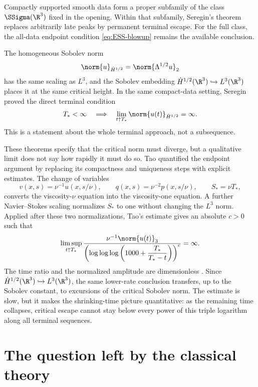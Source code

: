 Compactly supported smooth data form a proper subfamily of the class
\(\SSigma(\R^3)\) fixed in the opening.  Within that subfamily, Seregin's
theorem replaces arbitrarily late peaks by permanent terminal escape.  For
the full class, the all-data endpoint condition \eqref{eq:ESS-blowup} remains
the available conclusion.

The homogeneous Sobolev norm
\[
 \norm{u}_{\dot H^{1/2}}
 =\norm{\Lambda^{1/2}u}_2
\]
has the same scaling as \(L^3\), and the Sobolev embedding
\(\dot H^{1/2}(\R^3)\hookrightarrow L^3(\R^3)\) places it at the same
critical height.  In the same compact-data setting, Seregin proved the direct
terminal condition
\begin{equation}
 T_*<\infty
 \quad\Longrightarrow\quad
 \lim_{t\uparrow T_*}\norm{u(t)}_{\dot H^{1/2}}=\infty.
 \label{eq:seregin-critical-divergence}
\end{equation}
This is a statement about the whole terminal approach, not a
subsequence.

These theorems specify that the critical norm must diverge, but a qualitative
limit does not say how rapidly it must do so.  Tao quantified the endpoint
argument by replacing its compactness and uniqueness steps with explicit
estimates.  The change of variables
\[
 v(x,s)=\nu^{-1}u(x,s/\nu),
 \qquad q(x,s)=\nu^{-2}p(x,s/\nu),
 \qquad S_*=\nu T_*,
\]
converts the viscosity-\(\nu\) equation into the viscosity-one equation.
A further Navier--Stokes scaling normalizes \(S_*\) to one without changing
the \(L^3\) norm.  Applied after these two normalizations, Tao's estimate gives
an absolute \(c>0\) such that
\[
 \limsup_{t\uparrow T_*}
 \frac{\nu^{-1}\norm{u(t)}_3}
 {\left(\log\log\log\left(1000+
   \dfrac{T_*}{T_*-t}\right)\right)^c}
 =\infty.
\]
The time ratio and the normalized amplitude are dimensionless
.  Since
\(\dot H^{1/2}(\R^3)\hookrightarrow L^3(\R^3)\), the same lower-rate
conclusion transfers, up to the Sobolev constant, to excursions of the
critical Sobolev norm.  The estimate is slow, but it makes the shrinking-time
picture quantitative: as the remaining time collapses, critical escape cannot
stay below every power of this triple logarithm along all terminal sequences.

\section{The question left by the classical theory}
\label{sec:classical-question}

